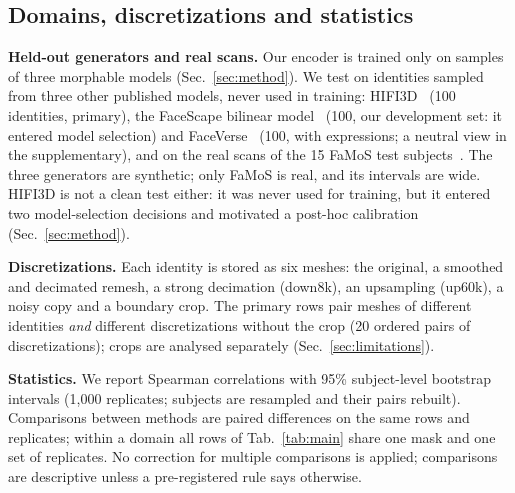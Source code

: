 \documentclass[10pt,twocolumn,letterpaper]{article}
\begin{document}
\subsection{Domains, discretizations and statistics}
\label{sec:domains}
\textbf{Held-out generators and real scans.} Our encoder is trained only on samples of three morphable models (Sec.~\ref{sec:method}). We test on identities sampled from three other published models, never used in training: HIFI3D~\cite{bao2021hifi3d} (100 identities, primary), the FaceScape bilinear model~\cite{facescape} (100, our development set: it entered model selection) and FaceVerse~\cite{wang2022faceverse} (100, with expressions; a neutral view in the supplementary), and on the real scans of the 15 FaMoS test subjects~\cite{bolkart2023tempeh}. The three generators are synthetic; only FaMoS is real, and its intervals are wide. HIFI3D is not a clean test either: it was never used for training, but it entered two model-selection decisions and motivated a post-hoc calibration (Sec.~\ref{sec:method}).

\textbf{Discretizations.} Each identity is stored as six meshes: the original, a smoothed and decimated remesh, a strong decimation (down8k), an upsampling (up60k), a noisy copy and a boundary crop. The primary rows pair meshes of different identities \emph{and} different discretizations without the crop (20 ordered pairs of discretizations); crops are analysed separately (Sec.~\ref{sec:limitations}).

\textbf{Statistics.} We report Spearman correlations with 95\% subject-level bootstrap intervals (1{,}000 replicates; subjects are resampled and their pairs rebuilt). Comparisons between methods are paired differences on the same rows and replicates; within a domain all rows of Tab.~\ref{tab:main} share one mask and one set of replicates. No correction for multiple comparisons is applied; comparisons are descriptive unless a pre-registered rule says otherwise.
\end{document}
